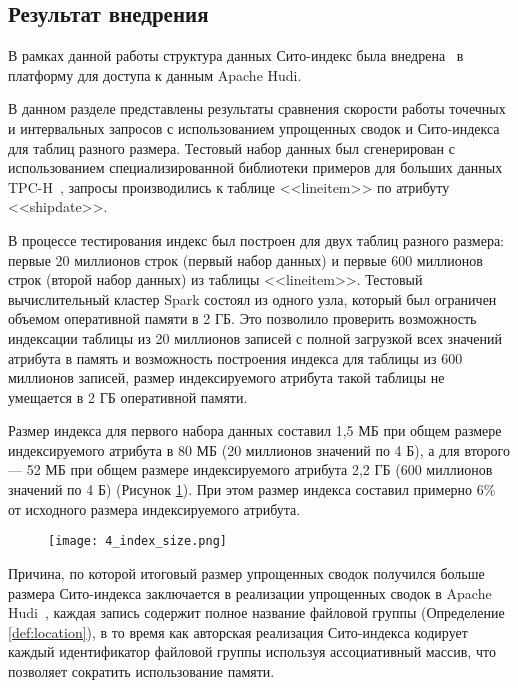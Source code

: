 \subsection{Результат внедрения}\label{subsec:results}

В рамках данной работы структура данных Сито-индекс была внедрена~\cite{Sieve_Github} в платформу для доступа к данным Apache Hudi.

В данном разделе представлены результаты сравнения скорости работы точечных и интервальных запросов с использованием упрощенных сводок и Сито-индекса для таблиц разного размера. Тестовый набор данных был сгенерирован с использованием специализированной библиотеки примеров для больших данных TPC-H~\cite{TPC-H}, запросы производились к таблице {<<lineitem>>} по атрибуту {<<shipdate>>}.

В процессе тестирования индекс был построен для двух таблиц разного размера: первые 20 миллионов строк (первый набор данных) и первые 600 миллионов строк (второй набор данных) из таблицы {<<lineitem>>}. Тестовый вычислительный кластер Spark состоял из одного узла, который был ограничен объемом оперативной памяти в 2 ГБ. Это позволило проверить возможность индексации таблицы из 20 миллионов записей с полной загрузкой всех значений атрибута в память и возможность построения индекса для таблицы из 600 миллионов записей, размер индексируемого атрибута такой таблицы не умещается в 2 ГБ оперативной памяти.

Размер индекса для первого набора данных составил 1,5 МБ при общем размере индексируемого атрибута в 80 МБ (20 миллионов значений по 4 Б), а для второго — 52 МБ при общем размере индексируемого атрибута 2,2 ГБ (600 миллионов значений по 4 Б) (Рисунок \ref{figure:index_size}). При этом размер индекса составил примерно $6\%$ от исходного размера индексируемого атрибута.

\begin{figure}[h]
    \centering
    \texttt{[image: 4\_index\_size.png]}
    \caption{}
    \label{figure:index_size}
\end{figure}

Причина, по которой итоговый размер упрощенных сводок получился больше размера Сито-индекса заключается в реализации упрощенных сводок в Apache Hudi~\cite{Hudi_MetadataPayload}, каждая запись содержит полное название файловой группы (Определение \ref{def:location}), в то время как авторская реализация Сито-индекса кодирует каждый идентификатор файловой группы используя ассоциативный массив, что позволяет сократить использование памяти. 

